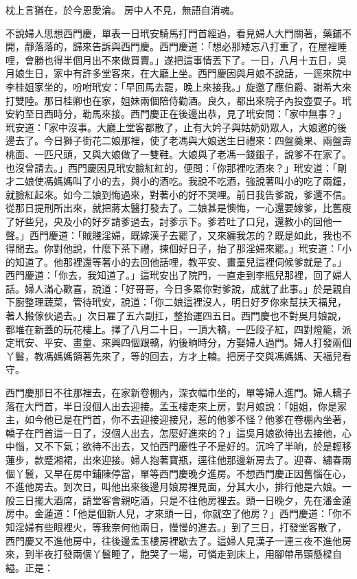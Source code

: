\begin{showcontents}{}
枕上言猶在，於今恩愛淪。
房中人不見，無語自消魂。

不說婦人思想西門慶，單表一日玳安騎馬打門首經過，看見婦人大門關著，藥鋪不開，靜落落的，歸來告訴與西門慶。西門慶道：「想必那矮忘八打重了，在屋裡睡哩，會勝也得半個月出不來做買賣。」遂把這事情丟下了。一日，八月十五日，吳月娘生日，家中有許多堂客來，在大廳上坐。西門慶因與月娘不說話，一逕來院中李桂姐家坐的，吩咐玳安：「早回馬去罷，晚上來接我。」旋邀了應伯爵、謝希大來打雙陸。那日桂卿也在家，姐妹兩個陪侍勸酒。良久，都出來院子內投壺耍子。玳安約至日西時分，勒馬來接。西門慶正在後邊出恭，見了玳安問：「家中無事？」玳安道：「家中沒事。大廳上堂客都散了，止有大妗子與姑奶奶眾人，大娘邀的後邊去了。今日獅子街花二娘那裡，使了老馮與大娘送生日禮來：四盤羹果、兩盤壽桃面、一匹尺頭，又與大娘做了一雙鞋。大娘與了老馮一錢銀子，說爹不在家了。也沒曾請去。」西門慶因見玳安臉紅紅的，便問：「你那裡吃酒來？」玳安道：「剛才二娘使馮媽媽叫了小的去，與小的酒吃。我說不吃酒，強說著叫小的吃了兩鐘，就臉紅起來。如今二娘到悔過來，對著小的好不哭哩。前日我告爹說，爹還不信。從那日提刑所出來，就把蔣太醫打發去了。二娘甚是懊悔，一心還要嫁爹，比舊瘦了好些兒，央及小的好歹請爹過去，討爹示下。爹若吐了口兒，還教小的回他一聲。」西門慶道：「賊賤淫婦，既嫁漢子去罷了，又來纏我怎的？既是如此，我也不得閒去。你對他說，什麼下茶下禮，揀個好日子，抬了那淫婦來罷。」玳安道：「小的知道了。他那裡還等著小的去回他話哩，教平安、畫童兒這裡伺候爹就是了。」西門慶道：「你去，我知道了。」這玳安出了院門，一直走到李瓶兒那裡，回了婦人話。婦人滿心歡喜，說道：「好哥哥，今日多累你對爹說，成就了此事。」於是親自下廚整理蔬菜，管待玳安，說道：「你二娘這裡沒人，明日好歹你來幫扶天福兒，著人搬傢伙過去。」次日雇了五六副扛，整抬運四五日。西門慶也不對吳月娘說，都堆在新蓋的玩花樓上。擇了八月二十日，一頂大轎，一匹段子紅，四對燈籠，派定玳安、平安、畫童、來興四個跟轎，約後晌時分，方娶婦人過門。婦人打發兩個丫鬟，教馮媽媽領著先來了，等的回去，方才上轎。把房子交與馮媽媽、天福兒看守。

西門慶那日不往那裡去，在家新卷棚內，深衣幅巾坐的，單等婦人進門。婦人轎子落在大門首，半日沒個人出去迎接。孟玉樓走來上房，對月娘說：「姐姐，你是家主，如今他已是在門首，你不去迎接迎接兒，惹的他爹不怪？他爹在卷棚內坐著，轎子在門首這一日了，沒個人出去，怎麼好進來的？」這吳月娘欲待出去接他，心中惱，又不下氣；欲待不出去，又怕西門慶性子不是好的。沉吟了半晌，於是輕移蓮步，款蹙湘裙，出來迎接。婦人抱著寶瓶，逕往他那邊新房去了。迎春、繡春兩個丫鬟，又早在房中鋪陳停當，單等西門慶晚夕進房。不想西門慶正因舊惱在心，不進他房去。到次日，叫他出來後邊月娘房裡見面，分其大小，排行他是六娘。一般三日擺大酒席，請堂客會親吃酒，只是不往他房裡去。頭一日晚夕，先在潘金蓮房中。金蓮道：「他是個新人兒，才來頭一日，你就空了他房？」西門慶道：「你不知淫婦有些眼裡火，等我奈何他兩日，慢慢的進去。」到了三日，打發堂客散了，西門慶又不進他房中，往後邊孟玉樓房裡歇去了。這婦人見漢子一連三夜不進他房來，到半夜打發兩個丫鬟睡了，飽哭了一場，可憐走到床上，用腳帶吊頸懸樑自縊。正是：


\end{showcontents}
